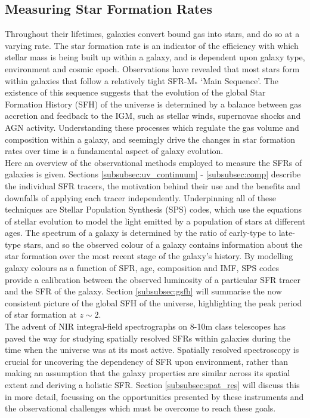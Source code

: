 \documentclass{literature}
\begin{document}
\subsection{Measuring Star Formation Rates}
Throughout their lifetimes, galaxies convert bound gas into stars, and do so at a varying rate. The star formation rate is an indicator of the efficiency with which stellar mass is being built up within a galaxy, and is dependent upon galaxy type, environment and cosmic epoch. Observations have revealed that most stars form within galaxies that follow a relatively tight SFR-M$_{*}$ `Main Sequence'. The existence of this sequence suggests that the evolution of the global Star Formation History (SFH) of the universe is determined by a balance between gas accretion and feedback to the IGM, such as stellar winds, supernovae shocks and AGN activity. Understanding these processes which regulate the gas volume and composition within a galaxy, and seemingly drive the changes in star formation rates over time is a fundamental aspect of galaxy evolution. \\ 
Here an overview of the observational methods employed to measure the SFRs of galaxies is given. 
Sections \ref{subsubsec:uv_continuum} - \ref{subsubsec:comp} describe the individual SFR tracers, the motivation behind their use and the benefits and downfalls of applying each tracer independently. Underpinning all of these techniques are Stellar Population Synthesis (SPS) codes, which use the equations of stellar evolution to model the light emitted by a population of stars at different ages. The spectrum of a galaxy is determined by the ratio of early-type to late-type stars, and so the observed colour of a galaxy contains information about the star formation over the most recent stage of the galaxy's history. By modelling galaxy colours as a function of SFR, age, composition and IMF, SPS codes provide a calibration between the observed luminosity of a particular SFR tracer and the SFR of the galaxy. Section \ref{subsubsec:gsfh} will summarise the now consistent picture of the global SFH of the universe, highlighting the peak period of star formation at $z \sim 2$.  \\ 

The advent of NIR integral-field spectrographs on 8-10m class telescopes has paved the way for studying spatially resolved SFRs within galaxies during the time when the universe was at its most active. Spatially resolved spectroscopy is crucial for uncovering the dependency of SFR upon environment, rather than making an assumption that the galaxy properties are similar across its spatial extent and deriving a holistic SFR. Section \ref{subsubsec:spat_res} will discuss this in more detail, focussing on the opportunities presented by these instruments and the observational challenges which must be overcome to reach these goals.     
\end{document}
